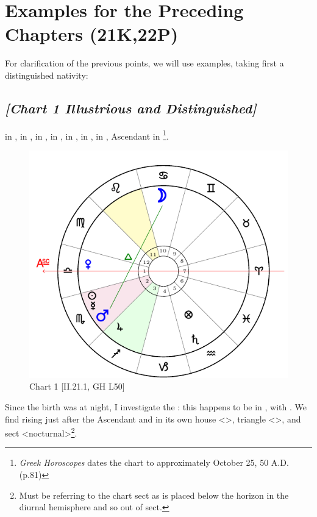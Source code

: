 \section{Examples for the Preceding Chapters (21K,22P)}
For clarification of the previous points, we will use examples, taking first a distinguished nativity:

\subsection*{\textit{[Chart 1 Illustrious and Distinguished]}}

\Sun\xspace in \Scorpio, \Moon\xspace in \Cancer, \Saturn\xspace in \Aquarius, \Jupiter\xspace in \Sagittarius, \Mars\xspace in \Scorpio, \Venus\xspace in \Libra, \Mercury\xspace in \Scorpio, Ascendant in \Libra
\footnote{\textit{Greek Horoscopes} dates the chart to approximately October 25, 50 A.D. (p.81)}. 

\clearpage
\begin{figure}
\centering
\vspace{-20pt}
\includegraphics[width=.68\textwidth]{charts/2_21_1}
\caption{Chart 1 [II.21.1, GH L50]}
\label{fig:chart01}
\end{figure}

Since the birth was at night, I investigate the \Moon: this
happens to be in \Cancer, \Trine\xspace with \Mars. We find \Mars\xspace rising just after the Ascendant and in its own
house <\Scorpio>, triangle <\Scorpio\xspace\Pisces\xspace \Cancer>, and sect <nocturnal>\footnote{Must be referring to the chart sect as \Mars\xspace is placed below the horizon in the diurnal hemisphere and so out of sect.}. 

